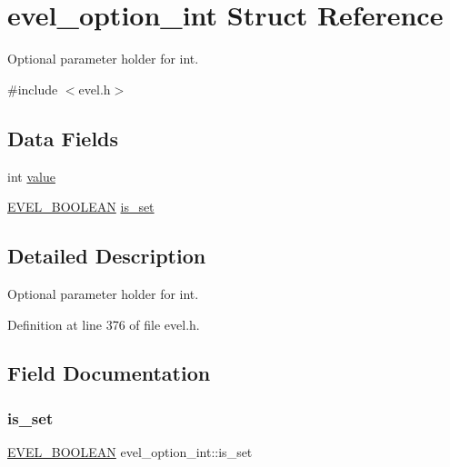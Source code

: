 \hypertarget{structevel__option__int}{}\section{evel\+\_\+option\+\_\+int Struct Reference}
\label{structevel__option__int}


Optional parameter holder for int.  




{\ttfamily \#include $<$evel.\+h$>$}

\subsection*{Data Fields}
\begin{DoxyCompactItemize}
\item 
int \hyperlink{structevel__option__int_adca20c0088fc5dcda3172853985f77c6}{value}
\item 
\hyperlink{evel_8h_af6468c18baf048a7617b485eb432197e}{E\+V\+E\+L\+\_\+\+B\+O\+O\+L\+E\+AN} \hyperlink{structevel__option__int_a76a00c50609466ec5c1753b9cc7342db}{is\+\_\+set}
\end{DoxyCompactItemize}


\subsection{Detailed Description}
Optional parameter holder for int. 

Definition at line 376 of file evel.\+h.



\subsection{Field Documentation}
\hypertarget{structevel__option__int_a76a00c50609466ec5c1753b9cc7342db}{}\label{structevel__option__int_a76a00c50609466ec5c1753b9cc7342db} 
\subsubsection{\texorpdfstring{is\+\_\+set}{is\_set}}
{\footnotesize\ttfamily \hyperlink{evel_8h_af6468c18baf048a7617b485eb432197e}{E\+V\+E\+L\+\_\+\+B\+O\+O\+L\+E\+AN} evel\+\_\+option\+\_\+int\+::is\+\_\+set}



